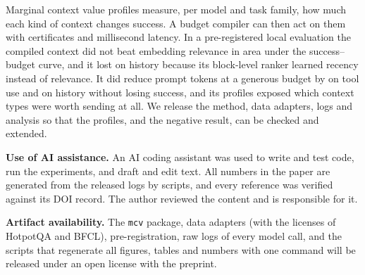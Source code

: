 Marginal context value profiles measure, per model and task family, how much each kind of context changes success.
A budget compiler can then act on them with certificates and millisecond latency. In a pre-registered local evaluation
the compiled context did not beat embedding relevance in area under the success--budget curve, and it lost on history
because its block-level ranker learned recency instead of relevance. It did reduce prompt tokens at a generous budget by
\RTokCutTool on tool use and \RTokCutHistory on history without losing success, and its profiles exposed which context
types were worth sending at all. We release the method, data adapters, logs and analysis so that the profiles, and the
negative result, can be checked and extended.

\textbf{Use of AI assistance.} An AI coding assistant was used to write and test code, run the experiments, and draft
and edit text. All numbers in the paper are generated from the released logs by scripts, and every reference was
verified against its DOI record. The author reviewed the content and is responsible for it.

\textbf{Artifact availability.} The \texttt{mcv} package, data adapters (with the licenses of HotpotQA and BFCL),
pre-registration, raw logs of every model call, and the scripts that regenerate all figures, tables and numbers with one
command will be released under an open license with the preprint.
